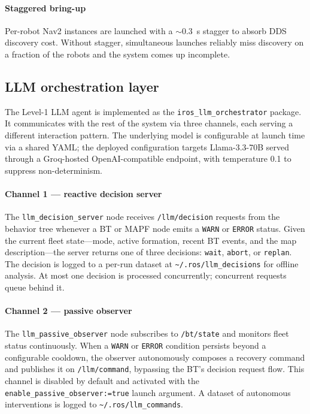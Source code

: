 \documentclass[conference]{IEEEtran}
\begin{document}
\paragraph{Staggered bring-up}
Per-robot Nav2 instances are launched with a $\sim$0.3~s
stagger to absorb DDS discovery cost. Without stagger,
simultaneous launches reliably miss discovery on a fraction of
the robots and the system comes up incomplete.

\subsection{LLM orchestration layer}

The Level-1 LLM agent is implemented as the
\texttt{iros\_llm\_orchestrator} package. It communicates with
the rest of the system via three channels, each serving a
different interaction pattern. The underlying model is
configurable at launch time via a shared YAML; the deployed
configuration targets Llama-3.3-70B served through a
Groq-hosted OpenAI-compatible endpoint, with temperature 0.1
to suppress non-determinism.

\paragraph{Channel 1 --- reactive decision server}
The \texttt{llm\_decision\_server} node receives
\texttt{/llm/decision} requests from the behavior tree
whenever a BT or MAPF node emits a \texttt{WARN} or
\texttt{ERROR} status. Given the current fleet state---mode,
active formation, recent BT events, and the map
description---the server returns one of three decisions:
\texttt{wait}, \texttt{abort}, or \texttt{replan}. The
decision is logged to a per-run dataset at
\texttt{\~{}/.ros/llm\_decisions} for offline analysis. At
most one decision is processed concurrently; concurrent
requests queue behind it.

\paragraph{Channel 2 --- passive observer}
The \texttt{llm\_passive\_observer} node subscribes to
\texttt{/bt/state} and monitors fleet status continuously.
When a \texttt{WARN} or \texttt{ERROR} condition persists
beyond a configurable cooldown, the observer autonomously
composes a recovery command and publishes it on
\texttt{/llm/command}, bypassing the BT's decision request
flow. This channel is disabled by default and activated with
the \texttt{enable\_passive\_observer:=true} launch argument.
A dataset of autonomous interventions is logged to
\texttt{\~{}/.ros/llm\_commands}.
\end{document}

